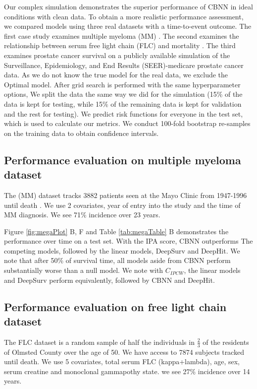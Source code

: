 \documentclass[APA,LATO1COL]{WileyNJD-v2}
\begin{document}
Our complex simulation demonstrates the superior performance of CBNN in
ideal conditions with clean data. To obtain a more realistic performance
assessment, we compared models using three real datasets with a
time-to-event outcome. The first case study examines multiple myeloma (MM) \citep{myeloma}.
The second examines the relationship between serum free light chain (FLC) and mortality \citep{flc}.
The third examines prostate cancer survival on a publicly available simulation of the Surveillance,
Epidemiology, and End Results (SEER)-medicare prostate cancer data\citep{prostate}.
As we do not know the true model for the real
data, we exclude the Optimal model. After grid search is performed with the same hyperparameter
options, We split the data the same way we did for the simulation (15\% of the data is 
kept for testing, while 15\% of the remaining data is kept for validation and the rest for testing).
We predict risk functions for everyone in the test set, which is used to calculate our metrics. We
conduct 100-fold bootstrap re-samples on the training data to
obtain confidence intervals.

\hypertarget{pe-multiplemyeloma}{%
\subsection{Performance evaluation on multiple myeloma dataset}\label{pe-multiplemyeloma}}
The (MM) dataset tracks 3882 patients seen at the Mayo Clinic from 1947-1996 until death \citep{myeloma}.
We use 2 covariates, year of entry into the study and the time of MM diagnosis\citep{myeloma}. We see 71\% incidence over 23 years\citep{myeloma}.

Figure \ref{fig:megaPlot} B, F and Table \ref{tab:megaTable} B
demonstrates the performance over time on a test set. With the IPA score, CBNN outperforms
The competing models, followed by the linear models, DeepSurv and DeepHit. We note that after
50\% of survival time, all models aside from CBNN perform substantially worse than a null model.
We note with \(C_{IPCW}\), the linear models and DeepSurv perform equivalently, followed by CBNN and
DeepHit.

\hypertarget{pe-flc}{%
\subsection{Performance evaluation on free light chain dataset}\label{pe-flc}}
The FLC dataset is a random sample of half the individuals in $\frac{2}{3}$ of the
residents of Olmsted County over the age of 50\citep{flc}. We have access to 7874 subjects
tracked until death\citep{flc}. We use 5 covariates, total serum FLC (kappa+lambda), age, sex,
serum creatine and monoclonal gammapothy state\citep{flc}. we see 27\% incidence over 14 years\citep{flc}.
\end{document}

